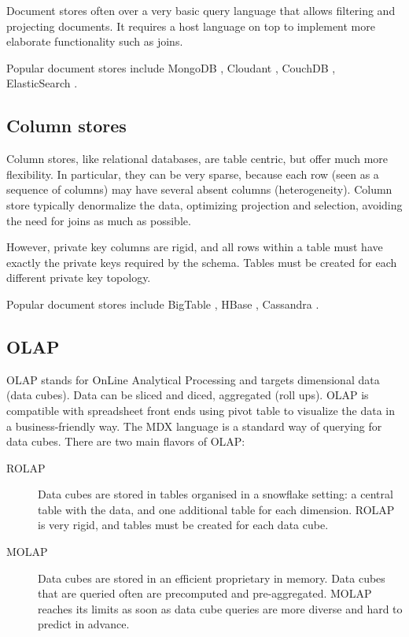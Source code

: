 \documentclass{vldb}
\begin{document}
Document stores often over a very basic query language that allows filtering and projecting documents. It requires a host language on top to implement more elaborate functionality such as joins. 

Popular document stores include MongoDB \cite{MongoDB}, Cloudant \cite{Cloudant}, CouchDB \cite{CouchDB}, ElasticSearch \cite{ElasticSearch}.

\subsection{Column stores}

Column stores, like relational databases, are table centric, but offer much more flexibility. In particular, they can be very sparse, because each row (seen as a sequence of columns) may have several absent columns (heterogeneity). Column store typically denormalize the data, optimizing projection and selection, avoiding the need for joins as much as possible.

However, private key columns are rigid, and all rows within a table must have exactly the private keys required by the schema. Tables must be created for each different private key topology.

Popular document stores include BigTable \cite{Chang2008}, HBase \cite{HBase}, Cassandra \cite{Lakshman2010}.

\subsection{OLAP}

OLAP \cite{Codd1993} stands for OnLine Analytical Processing and targets dimensional data (data cubes). Data can be sliced and diced, aggregated (roll ups). OLAP is compatible with spreadsheet front ends using pivot table to visualize the data in a business-friendly way. The MDX language \cite{Nolan1999} is a standard way of querying for data cubes. There are two main flavors of OLAP:
\begin{description}
\item[ROLAP] Data cubes are stored in tables organised in a snowflake setting: a central table with the data, and one additional table for each dimension. ROLAP is very rigid, and tables must be created for each data cube.
\item[MOLAP] Data cubes are stored in an efficient proprietary in memory. Data cubes that are queried often are precomputed and pre-aggregated. MOLAP reaches its limits as soon as data cube queries are more diverse and hard to predict in advance.
\end{description}
\end{document}
